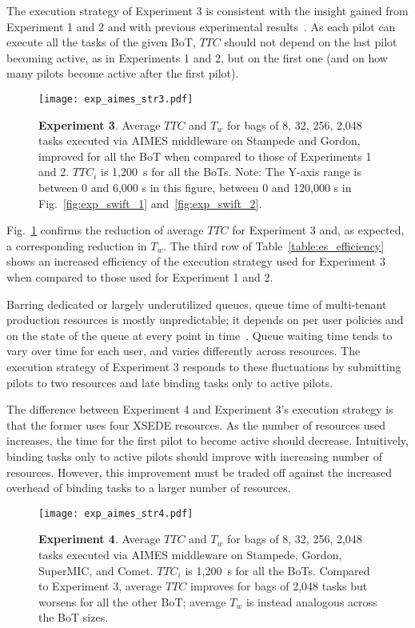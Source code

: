 \documentclass[10pt, conference, compsocconf]{IEEEtran}
\newcommand{\B}[1]{\textbf{#1}\xspace}
\begin{document}
The execution strategy of Experiment 3 is consistent with the insight gained
from Experiment 1 and 2 and with previous experimental
results~\cite{turilli2016integrating}. As each pilot can execute all the
tasks of the given BoT, \(TTC\) should not depend on the last pilot becoming
active, as in Experiments 1 and 2, but on the first one (and on how many
pilots become active after the first pilot).

\begin{figure}
  \centering
  \texttt{[image: exp\_aimes\_str3.pdf]}
  \caption{\B{Experiment 3}. Average \(TTC\) and \(T_w\) for bags of
           8, 32, 256, 2,048 tasks executed via AIMES middleware on Stampede
           and Gordon, improved for all the BoT when compared to those of
           Experiments 1 and 2. \(TTC_i\) is 1,200~s for all the BoTs. Note:
           The Y-axis range is between 0 and 6,000 s in this figure, between
           0 and 120,000 s in Fig.~\ref{fig:exp_swift_1}
           and~\ref{fig:exp_swift_2}.}\label{fig:exp_aimes_3}
\end{figure}

Fig.~\ref{fig:exp_aimes_3} confirms the reduction of average \(TTC\) for
Experiment 3 and, as expected, a corresponding reduction in \(T_w\). The
third row of Table~\ref{table:es_efficiency} shows an increased efficiency of
the execution strategy used for Experiment 3 when compared to those used for
Experiment 1 and 2.

Barring dedicated or largely underutilized queues, queue time of multi-tenant
production resources  is mostly unpredictable; it depends on per user
policies and on the state of the queue at every point in
time~\cite{wolski2003experiences}. Queue waiting time tends to vary over time
for each user, and varies differently across resources. The execution
strategy of Experiment 3 responds to these fluctuations by submitting pilots
to two resources and late binding tasks only to active pilots.

The difference between Experiment 4 and Experiment 3's execution strategy is
that the former uses four XSEDE resources.  As the number of resources used
increases, the time for the first pilot to become active should decrease.
Intuitively, binding tasks only to active pilots should improve with
increasing number of resources. However, this improvement must be traded off
against the increased overhead of binding tasks to a larger number of
resources.

\begin{figure}
  \centering
  \texttt{[image: exp\_aimes\_str4.pdf]}
  \caption{ \B{Experiment 4}. Average \(TTC\) and \(T_w\) for bags of 8, 32,
            256, 2,048 tasks executed via AIMES middleware on Stampede,
            Gordon, SuperMIC, and Comet. \(TTC_i\) is 1,200~s for all the
            BoTs. Compared to Experiment 3, average \(TTC\) improves for bags
            of 2,048 tasks but worsens for all the other BoT\@; average
            \(T_w\) is instead analogous across the BoT
            sizes.\label{fig:exp_aimes_4}}
\end{figure}
\end{document}
